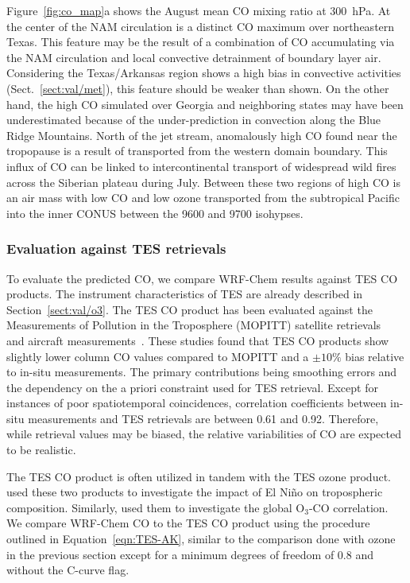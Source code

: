 Figure~\ref{fig:co_map}a shows the August mean CO mixing ratio at 300~hPa. At the
center of the NAM circulation is a distinct CO maximum over northeastern Texas. This
feature may be the result of a combination of CO accumulating via the NAM circulation
and local convective detrainment of boundary layer air. Considering the Texas/Arkansas region
shows a high bias in convective activities (Sect.~\ref{sect:val/met}), this feature
should be weaker than shown. On the other hand, the high CO simulated over
Georgia and neighboring states may have been underestimated because of the
under-prediction in convection along the Blue Ridge Mountains. North of the
jet stream, anomalously high CO found near the tropopause is a result of transported from the
western domain boundary. This influx of CO can be linked to intercontinental transport
of widespread wild fires across the Siberian plateau during July. Between these two regions
of high CO is an air mass with low CO and low ozone transported from the
subtropical Pacific into the inner CONUS between the 9600 and 9700 isohypses.

\subsubsection{Evaluation against TES retrievals}

To evaluate the predicted CO, we compare WRF-Chem results
against TES CO products. The instrument characteristics of TES are already described
in Section~\ref{sect:val/o3}. The TES CO product has been evaluated against the
Measurements of Pollution in the Troposphere (MOPITT) satellite
retrievals~\citep{Luo:2007ly,Ho:2009lh} and aircraft
measurements~\citep{Luo:2007vn,Lopez:2008ys}. These studies found that TES CO products
show slightly lower column CO values compared to MOPITT and a $\pm10\%$ bias
relative to in-situ measurements. The primary contributions being smoothing errors
and the dependency on the a priori constraint used for TES retrieval. Except for instances
of poor spatiotemporal coincidences, correlation coefficients between in-situ measurements
and TES retrievals are between 0.61 and 0.92. Therefore, while retrieval values may
be biased, the relative variabilities of CO are expected to be realistic.

The TES CO product is often utilized in tandem with the TES ozone product.
\citet{Logan:2008uq} used these two products to investigate the impact of El Ni\~no
on tropospheric composition. Similarly, \citet{Voulgarakis:2011fk} used them to
investigate the global O$_3$-CO correlation. We compare WRF-Chem CO
to the TES CO product using the procedure outlined in Equation~\ref{eqn:TES-AK},
similar to the comparison done with ozone in the  previous section except for a
minimum degrees of freedom of 0.8 and without the C-curve flag.

